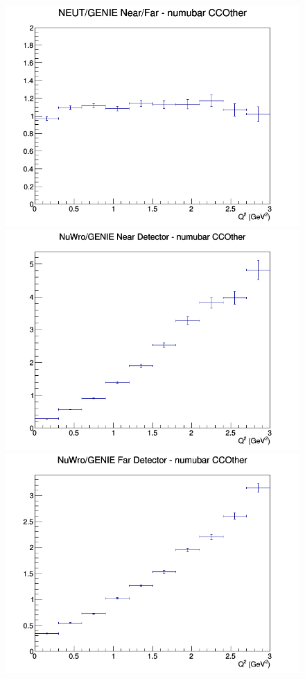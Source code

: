 \begin{figure}[h]
\endminipage
{}
\includegraphics[width=\linewidth]{Q2/nominal/ratios/CCOther_NEUT_GENIE_numubar_NF_Q2.png}
\endminipage
\newline
{}
\includegraphics[width=\linewidth]{Q2/nominal/ratios/CCOther_NuWro_GENIE_numubar_near_Q2.png}
\endminipage
{}
\includegraphics[width=\linewidth]{Q2/nominal/ratios/CCOther_NuWro_GENIE_numubar_far_Q2.png}

\end{figure}
